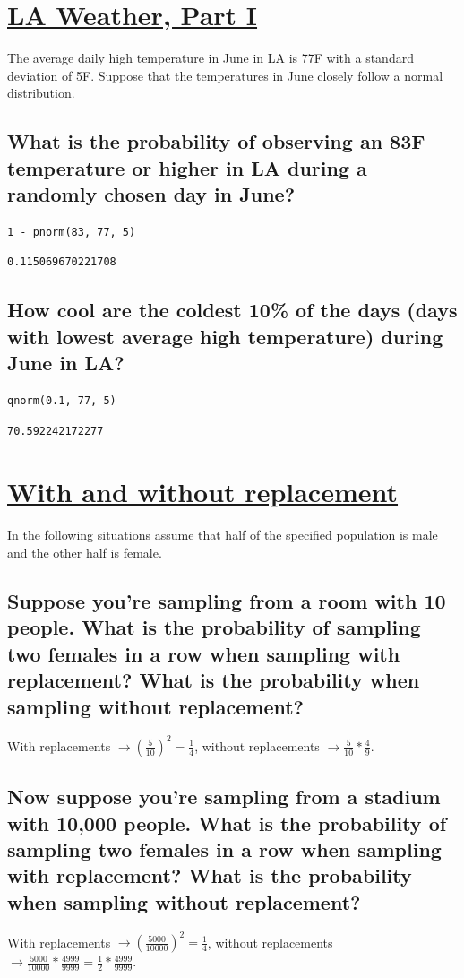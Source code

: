 \documentclass[11pt]{article}
\begin{document}
\section{\underline{LA Weather, Part I}}
\label{sec:org3cf2115}
The average daily high temperature in June in LA is 77F with a standard deviation of 5F. Suppose that the temperatures in June closely follow a normal distribution.
\subsection{What is the probability of observing an 83F temperature or higher in LA during a randomly chosen day in June?}
\label{sec:orgf755cdb}
\begin{verbatim}
1 - pnorm(83, 77, 5)
\end{verbatim}

\begin{verbatim}
0.115069670221708
\end{verbatim}

\subsection{How cool are the coldest 10\% of the days (days with lowest average high temperature) during June in LA?}
\label{sec:org17f854c}
\begin{verbatim}
qnorm(0.1, 77, 5)
\end{verbatim}

\begin{verbatim}
70.592242172277
\end{verbatim}

\section{\underline{With and without replacement}}
\label{sec:orgf92bf15}
In the following situations assume that half of the specified population is male and the other half is female.
\subsection{Suppose you're sampling from a room with 10 people. What is the probability of sampling two females in a row when sampling with replacement? What is the probability when sampling without replacement?}
\label{sec:org57529ad}
With replacements \(\to (\frac{5}{10})^2 = \frac{1}{4}\), without replacements \(\to \frac{5}{10}*\frac{4}{9}\).
\subsection{Now suppose you're sampling from a stadium with 10,000 people. What is the probability of sampling two females in a row when sampling with replacement? What is the probability when sampling without replacement?}
\label{sec:orgfa95744}
With replacements \(\to (\frac{5000}{10000})^2 = \frac{1}{4}\), without replacements \(\to \frac{5000}{10000}*\frac{4999}{9999} = \frac{1}{2}*\frac{4999}{9999}\).
\end{document}
